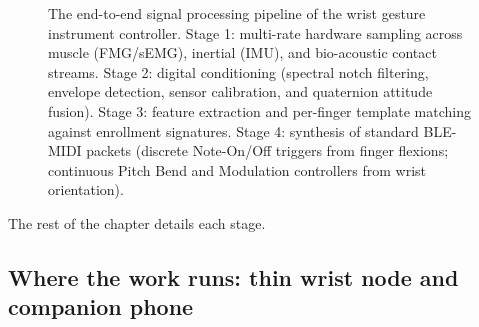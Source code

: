 \begin{figure}[H]
\begin{tikzpicture}[font=\small, scale=0.86, every node/.style={transform shape}, >=Latex]
\end{tikzpicture}
\caption{The end-to-end signal processing pipeline of the wrist gesture instrument controller. Stage 1: multi-rate hardware sampling across muscle (FMG/sEMG), inertial (IMU), and bio-acoustic contact streams. Stage 2: digital conditioning (spectral notch filtering, envelope detection, sensor calibration, and quaternion attitude fusion). Stage 3: feature extraction and per-finger template matching against enrollment signatures. Stage 4: synthesis of standard BLE-MIDI packets (discrete Note-On/Off triggers from finger flexions; continuous Pitch Bend and Modulation controllers from wrist orientation).}
\label{ch41:fig-pipeline}
\end{figure}

The rest of the chapter details each stage.

\subsection{Where the work runs: thin wrist node and companion phone}
\label{ch41:architecture}

